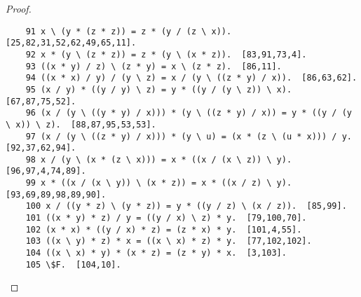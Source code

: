 \documentclass[12pt]{report}
\theoremstyle{definition}
\begin{document}
\begin{proof}
\begin{lstlisting}
  	91 x \ (y * (z * z)) = z * (y / (z \ x)).  [25,82,31,52,62,49,65,11].
  	92 x * (y \ (z * z)) = z * (y \ (x * z)).  [83,91,73,4].
  	93 ((x * y) / z) \ (z * y) = x \ (z * z).  [86,11].
  	94 ((x * x) / y) / (y \ z) = x / (y \ ((z * y) / x)).  [86,63,62].
  	95 (x / y) * ((y / y) \ z) = y * ((y / (y \ z)) \ x).  [67,87,75,52].
  	96 (x / (y \ ((y * y) / x))) * (y \ ((z * y) / x)) = y * ((y / (y \ x)) \ z).  [88,87,95,53,53].
  	97 (x / (y \ ((z * y) / x))) * (y \ u) = (x * (z \ (u * x))) / y.  [92,37,62,94].
  	98 x / (y \ (x * (z \ x))) = x * ((x / (x \ z)) \ y).  [96,97,4,74,89].
  	99 x * ((x / (x \ y)) \ (x * z)) = x * ((x / z) \ y).  [93,69,89,98,89,90].
  	100 x / ((y * z) \ (y * z)) = y * ((y / z) \ (x / z)).  [85,99].
  	101 ((x * y) * z) / y = ((y / x) \ z) * y.  [79,100,70].
  	102 (x * x) * ((y / x) * z) = (z * x) * y.  [101,4,55].
  	103 ((x \ y) * z) * x = ((x \ x) * z) * y.  [77,102,102].
  	104 ((x \ x) * y) * (x * z) = (z * y) * x.  [3,103].
  	105 \$F.  [104,10].
  \end{lstlisting}


\end{proof}
\end{document}
